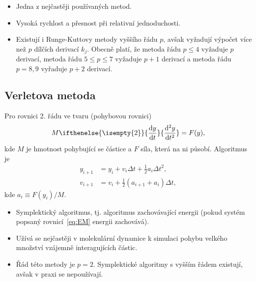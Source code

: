 \documentclass[a4paper,11pt,twoside]{article}
\renewcommand{\d}{\mathrm{d}}
\newcommand{\derivative}[3][]{\ifthenelse{\isempty{#1}}	    %
	{\frac{\d{#2}}{\d{#3}}}
	{\frac{\d^{#1}{#2}}{\d{#3}^{#1}}}
}
\begin{document}
        \begin{itemize}
            \item Jedna z nejčastěji používaných metod.
            \item Vysoká rychlost a přesnost při relativní jednoduchosti.
            \item Existují i Runge-Kuttovy metody vyššího řádu $p$, avšak vyžadují výpočet více než $p$ dílčích derivací $k_{j}$.
            Obecně platí, že metoda řádu $p\leq4$ vyžaduje $p$ derivací, metoda řádu $5\leq p\leq7$ vyžaduje $p+1$ derivací a metoda řádu $p=8,9$ vyřaduje $p+2$ derivací.
        \end{itemize}

    \subsection{Verletova metoda}\label{sec:Verlet}
        Pro rovnici 2. řádu ve tvaru (pohybovou rovnici)
        \begin{equation}\label{eq:EM}
            M\derivative[2]{y}{t}=F(y),
        \end{equation}
        kde $M$ je hmotnost pohybující se částice a $F$ síla, která na ni působí.
        Algoritmus je
        \begin{align}
            y_{i+1}&=y_{i}+v_{i}\Delta t+\frac{1}{2}a_{i}\Delta t^{2},\nonumber\\
            v_{i+1}&=v_{i}+\frac{1}{2}\left(a_{i+1}+a_{i}\right)\Delta t,
        \end{align}
        kde $a_{i}\equiv F(y_{i})/M$.

        \begin{itemize}
            \item Symplektický algoritmus, tj. algoritmus zachovávající energii (pokud systém popsaný rovnicí~\eqref{eq:EM} energii zachovává).
            \item Užívá se nejčastěji v molekulární dynamice k simulaci pohybu velkého množství vzájemně interagujících částic.
            \item Řád této metody je $p=2$. Symplektické algoritmy s vyšším řádem existují, avšak v praxi se nepoužívají.
        \end{itemize}
\end{document}

